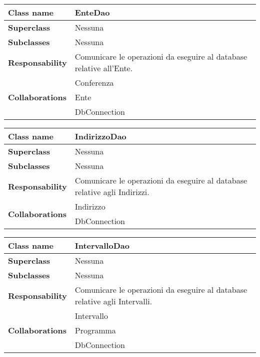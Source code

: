 \begin{table}[h!]
	\begin{tabular}{|l|l|}
		\hline 
		\textbf{Class name} & EnteDao
		\\ \hline
		\textbf{Superclass} & Nessuna
		\\ \hline
		\multirow{1}{*}{\textbf{Subclasses}} & Nessuna
		\\ \hline
		\textbf{Responsability} & Comunicare le operazioni da eseguire al database relative all'Ente.
		\\ \hline
		\multirow{3}{*}{\textbf{Collaborations}} & Conferenza \\ 
		& Ente \\
		& DbConnection \\ \hline
	\end{tabular}
\end{table}

\begin{table}[h!]
	\begin{tabular}{|l|l|}
		\hline 
		\textbf{Class name} & IndirizzoDao
		\\ \hline
		\textbf{Superclass} & Nessuna
		\\ \hline
		\multirow{1}{*}{\textbf{Subclasses}} & Nessuna
		\\ \hline
		\textbf{Responsability} & Comunicare le operazioni da eseguire al database relative agli Indirizzi.
		\\ \hline
		\multirow{2}{*}{\textbf{Collaborations}} & Indirizzo \\ 
		& DbConnection \\
	\hline
	\end{tabular}
\end{table}	

\newpage

\begin{table}[h!]
	\begin{tabular}{|l|l|}
		\hline 
		\textbf{Class name} & IntervalloDao
		\\ \hline
		\textbf{Superclass} & Nessuna
		\\ \hline
		\multirow{1}{*}{\textbf{Subclasses}} & Nessuna
		\\ \hline
		\textbf{Responsability} & Comunicare le operazioni da eseguire al database relative agli Intervalli.
		\\ \hline
		\multirow{3}{*}{\textbf{Collaborations}} & Intervallo \\ 
		& Programma \\
		& DbConnection \\ \hline
	\end{tabular}
\end{table}

